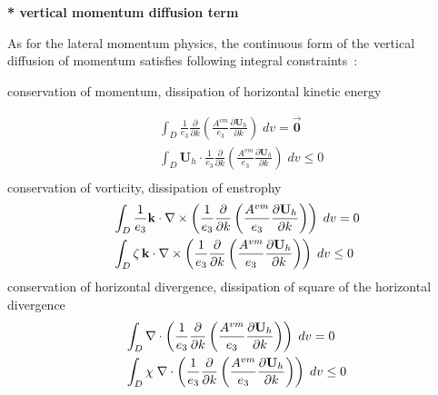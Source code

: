 \documentclass[NEMO_book]{subfiles}
\begin{document}
\textbf{* vertical momentum diffusion term}

As for the lateral momentum physics, the continuous form of the vertical 
diffusion of momentum satisfies following integral constraints~:

conservation of momentum, dissipation of horizontal kinetic energy

\begin{equation} \label{Eq_dynzdf_dyn}
\begin{aligned}
& \int_D {\frac{1}{e_3 }}  \frac{\partial }{\partial k}\left( \frac{A^{vm}}{e_3 }\frac{\partial {\textbf{U}}_h }{\partial k} \right) \;dv = \overrightarrow{\textbf{0}} \\ 
& \int_D \textbf{U}_h \cdot \frac{1}{e_3} \frac{\partial}{\partial k} \left( {\frac{A^{vm}}{e_3 }}{\frac{\partial \textbf{U}_h }{\partial k}} \right) \;dv \leq 0 \\ 
 \end{aligned} 
 \end{equation}
conservation of vorticity, dissipation of enstrophy
\begin{equation} \label{Eq_dynzdf_vor}
\begin{aligned}
& \int_D {\frac{1}{e_3 }{\rm {\bf k}}\cdot \nabla \times \left( {\frac{1}{e_3 
}\frac{\partial }{\partial k}\left( {\frac{A^{vm}}{e_3 }\frac{\partial {\rm 
{\bf U}}_h }{\partial k}} \right)} \right)\;dv} =0 \\ 
& \int_D {\zeta \,{\rm {\bf k}}\cdot \nabla \times \left( {\frac{1}{e_3 
}\frac{\partial }{\partial k}\left( {\frac{A^{vm}}{e_3 }\frac{\partial {\rm 
{\bf U}}_h }{\partial k}} \right)} \right)\;dv} \leq 0 \\ 
\end{aligned}
\end{equation}
conservation of horizontal divergence, dissipation of square of the 
horizontal divergence
\begin{equation} \label{Eq_dynzdf_div}
\begin{aligned}
 &\int_D {\nabla \cdot \left( {\frac{1}{e_3 }\frac{\partial }{\partial 
k}\left( {\frac{A^{vm}}{e_3 }\frac{\partial {\rm {\bf U}}_h }{\partial k}} 
\right)} \right)\;dv} =0 \\ 
& \int_D {\chi \;\nabla \cdot \left( {\frac{1}{e_3 }\frac{\partial }{\partial 
k}\left( {\frac{A^{vm}}{e_3 }\frac{\partial {\rm {\bf U}}_h }{\partial k}} 
\right)} \right)\;dv} \leq 0 \\ 
\end{aligned}
\end{equation}
\end{document}
